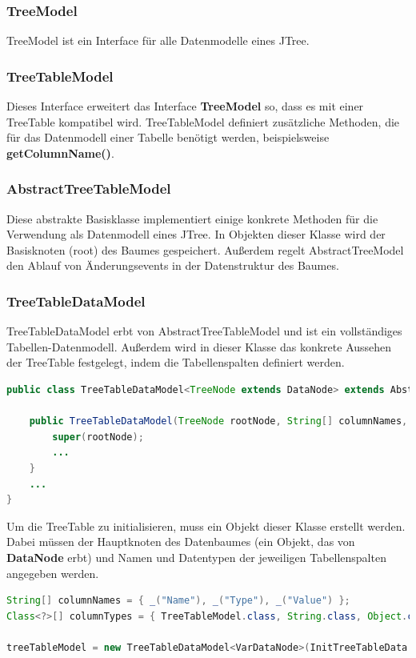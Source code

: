 \subsubsection*{TreeModel}
TreeModel ist ein Interface für alle Datenmodelle eines JTree.

\subsubsection*{TreeTableModel}
Dieses Interface erweitert das Interface \textbf{TreeModel} so, dass es mit einer TreeTable kompatibel wird. TreeTableModel definiert zusätzliche Methoden, die für das Datenmodell einer Tabelle benötigt werden, beispielsweise \textbf{getColumnName()}.

\subsubsection*{AbstractTreeTableModel}
Diese abstrakte Basisklasse implementiert einige konkrete Methoden für die Verwendung als Datenmodell eines JTree. In Objekten dieser Klasse wird der Basisknoten (root) des Baumes gespeichert. Außerdem regelt AbstractTreeModel den Ablauf von Änderungsevents in der Datenstruktur des Baumes.

\subsubsection*{TreeTableDataModel}
TreeTableDataModel erbt von AbstractTreeTableModel und ist ein vollständiges Tabellen-Datenmodell. Außerdem wird in dieser Klasse das konkrete Aussehen der TreeTable festgelegt, indem die Tabellenspalten definiert werden.
\begin{lstlisting}[language=JAVA]
public class TreeTableDataModel<TreeNode extends DataNode> extends AbstractTreeTableModel<TreeNode> {

	public TreeTableDataModel(TreeNode rootNode, String[] columnNames, Class<?>[] columnTypes, int currFunc) {
		super(rootNode);
		...
    }
    ...
}
\end{lstlisting}

Um die TreeTable zu initialisieren, muss ein Objekt dieser Klasse erstellt werden. Dabei müssen der Hauptknoten des Datenbaumes (ein Objekt, das von \textbf{DataNode} erbt) und Namen und Datentypen der jeweiligen Tabellenspalten angegeben werden.
\begin{lstlisting}[language=JAVA]
String[] columnNames = { _("Name"), _("Type"), _("Value") };
Class<?>[] columnTypes = { TreeTableModel.class, String.class, Object.class };

treeTableModel = new TreeTableDataModel<VarDataNode>(InitTreeTableData.createDataStructure(fileName), columnNames, columnTypes);
\end{lstlisting}

